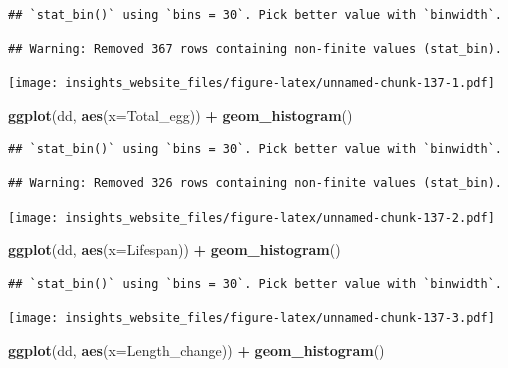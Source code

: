\documentclass[]{book}
\newenvironment{Shaded}{\begin{snugshade}}{\end{snugshade}}
\newcommand{\DataTypeTok}[1]{\textcolor[rgb]{0.13,0.29,0.53}{#1}}
\newcommand{\KeywordTok}[1]{\textcolor[rgb]{0.13,0.29,0.53}{\textbf{#1}}}
\newcommand{\NormalTok}[1]{#1}
\newcommand{\OperatorTok}[1]{\textcolor[rgb]{0.81,0.36,0.00}{\textbf{#1}}}
\newcommand{\StringTok}[1]{\textcolor[rgb]{0.31,0.60,0.02}{#1}}
\begin{document}
\begin{verbatim}
## `stat_bin()` using `bins = 30`. Pick better value with `binwidth`.
\end{verbatim}

\begin{verbatim}
## Warning: Removed 367 rows containing non-finite values (stat_bin).
\end{verbatim}

\texttt{[image: insights\_website\_files/figure-latex/unnamed-chunk-137-1.pdf]}

\begin{Shaded}
\begin{Highlighting}[]
\KeywordTok{ggplot}\NormalTok{(dd, }\KeywordTok{aes}\NormalTok{(}\DataTypeTok{x=}\NormalTok{Total_egg)) }\OperatorTok{+}
\StringTok{  }\KeywordTok{geom_histogram}\NormalTok{()}
\end{Highlighting}
\end{Shaded}

\begin{verbatim}
## `stat_bin()` using `bins = 30`. Pick better value with `binwidth`.
\end{verbatim}

\begin{verbatim}
## Warning: Removed 326 rows containing non-finite values (stat_bin).
\end{verbatim}

\texttt{[image: insights\_website\_files/figure-latex/unnamed-chunk-137-2.pdf]}

\begin{Shaded}
\begin{Highlighting}[]
\KeywordTok{ggplot}\NormalTok{(dd, }\KeywordTok{aes}\NormalTok{(}\DataTypeTok{x=}\NormalTok{Lifespan)) }\OperatorTok{+}
\StringTok{  }\KeywordTok{geom_histogram}\NormalTok{()}
\end{Highlighting}
\end{Shaded}

\begin{verbatim}
## `stat_bin()` using `bins = 30`. Pick better value with `binwidth`.
\end{verbatim}

\texttt{[image: insights\_website\_files/figure-latex/unnamed-chunk-137-3.pdf]}

\begin{Shaded}
\begin{Highlighting}[]
\KeywordTok{ggplot}\NormalTok{(dd, }\KeywordTok{aes}\NormalTok{(}\DataTypeTok{x=}\NormalTok{Length_change)) }\OperatorTok{+}
\StringTok{  }\KeywordTok{geom_histogram}\NormalTok{()}
\end{Highlighting}
\end{Shaded}
\end{document}
